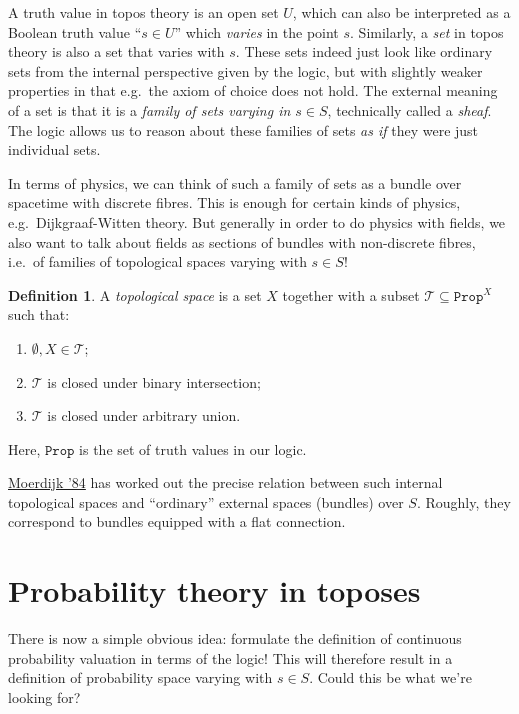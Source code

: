 \documentclass[11pt, oneside, article]{memoir}
\theoremstyle{plain}
\theoremstyle{definition}
\newtheorem{definition}[theorem]{Definition}
\theoremstyle{remark}
\newcommand{\const}[1]{\mathtt{#1}}
\newcommand{\Prop}{\const{Prop}}
\begin{document}
A truth value in topos theory is an open set $U$, which can also be interpreted as a Boolean truth value ``$s\in U$'' which \emph{varies} in the point $s$. Similarly, a \emph{set} in topos theory is also a set that varies with $s$. These sets indeed just look like ordinary sets from the internal perspective given by the logic, but with slightly weaker properties in that e.g.~the axiom of choice does not hold. The external meaning of a set is that it is a \emph{family of sets varying in $s\in S$}, technically called a \emph{sheaf}. The logic allows us to reason about these families of sets \emph{as if} they were just individual sets.

In terms of physics, we can think of such a family of sets as a bundle over spacetime with discrete fibres. This is enough for certain kinds of physics, e.g.~Dijkgraaf-Witten theory. But generally in order to do physics with fields, we also want to talk about fields as sections of bundles with non-discrete fibres, i.e.~of families of topological spaces varying with $s \in S$!

\begin{definition}
A \emph{topological space} is a set $X$ together with a subset $\mathcal{T} \subseteq \Prop^X$ such that:
\begin{enumerate}
\item $\emptyset,X\in\mathcal{T}$;
\item $\mathcal{T}$ is closed under binary intersection;
\item $\mathcal{T}$ is closed under arbitrary union.
\end{enumerate}
\end{definition}

Here, $\Prop$ is the set of truth values in our logic.

\href{http://www.numdam.org/item?id=CM_1984__53_2_171_0}{Moerdijk '84} has worked out the precise relation between such internal topological spaces and ``ordinary'' external spaces (bundles) over $S$. Roughly, they correspond to bundles equipped with a flat connection.

\chapter{Probability theory in toposes}

There is now a simple obvious idea: formulate the definition of continuous probability valuation in terms of the logic! This will therefore result in a definition of probability space varying with $s \in S$. Could this be what we're looking for?
\end{document}

